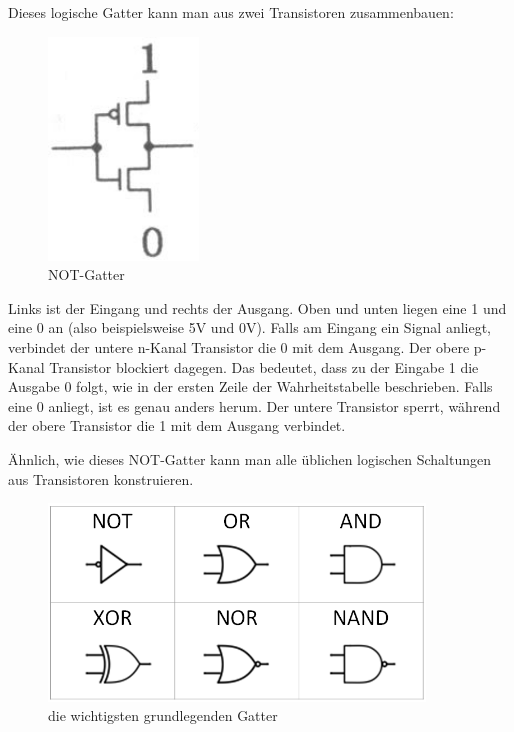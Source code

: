 \documentclass[12pt, a4paper]{article}
\begin{document}
Dieses logische Gatter kann man aus zwei Transistoren zusammenbauen:

\begin{figure}[H]
	\begin{center}
		\includegraphics [width=4cm]{NOT.png}
	\end{center}
	\caption{NOT-Gatter}
\end{figure}

Links ist der Eingang und rechts der Ausgang. Oben und unten liegen eine 1 und eine 0 an (also beispielsweise 5V und 0V). Falls am Eingang ein Signal anliegt, verbindet der untere n-Kanal Transistor die 0 mit dem Ausgang. Der obere p-Kanal Transistor blockiert dagegen. Das bedeutet, dass zu der Eingabe 1 die Ausgabe 0 folgt, wie in der ersten Zeile der Wahrheitstabelle beschrieben. Falls eine 0 anliegt, ist es genau anders herum. Der untere Transistor sperrt, während der obere Transistor die 1 mit dem Ausgang verbindet.

Ähnlich, wie dieses NOT-Gatter kann man alle üblichen logischen Schaltungen aus Transistoren konstruieren. 

\begin{figure}[H]
	\begin{center}
		\includegraphics [width=10cm]{Gatter.png}
	\end{center}
	\caption{die wichtigsten grundlegenden Gatter}
\end{figure}
\end{document}
